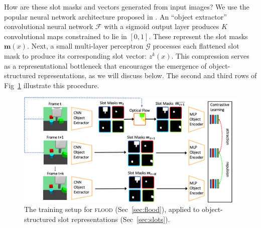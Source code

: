 \documentclass{article}
\begin{document}
How are these slot masks and vectors generated from input images? We use the popular neural network architecture proposed in \citet{kipf2019contrastive}. An ``object extractor'' convolutional neural network $\mathcal{F}$ with a sigmoid output layer produces $K$ convolutional maps constrained to lie in $[0, 1]$. These represent the slot masks $ \bm{m}(x)$. Next, a small multi-layer perceptron $\mathcal{G}$ processes each flattened slot mask to produce its corresponding slot vector: $z^k(x)$. This compression serves as a representational bottleneck that encourages the emergence of object-structured representations, as we will discuss below. The second and third rows of Fig~\ref{fig:architecture} illustrate this procedure.

 






\begin{figure}
  \centering
  \includegraphics[width=14cm]{figs/flood-network.pdf}

  \caption{The training setup for \textsc{flood} (Sec~\ref{sec:flood}), applied to object-structured slot representations (Sec~\ref{sec:slots}).}
  \label{fig:architecture}
\end{figure}
\end{document}
